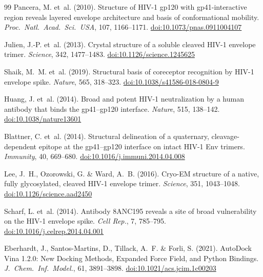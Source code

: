 \documentclass[11pt,a4paper]{article}
\begin{document}
\begin{thebibliography}{99}
Pancera, M. et~al. (2010).
\newblock Structure of HIV-1 gp120 with gp41-interactive region reveals layered envelope architecture and basis of conformational mobility.
\newblock \textit{Proc.\ Natl.\ Acad.\ Sci.\ USA}, 107, 1166--1171.
\newblock \href{https://doi.org/10.1073/pnas.0911004107}{doi:10.1073/pnas.0911004107}

Julien, J.-P. et~al. (2013).
\newblock Crystal structure of a soluble cleaved HIV-1 envelope trimer.
\newblock \textit{Science}, 342, 1477--1483.
\newblock \href{https://doi.org/10.1126/science.1245625}{doi:10.1126/science.1245625}

Shaik, M.~M. et~al. (2019).
\newblock Structural basis of coreceptor recognition by HIV-1 envelope spike.
\newblock \textit{Nature}, 565, 318--323.
\newblock \href{https://doi.org/10.1038/s41586-018-0804-9}{doi:10.1038/s41586-018-0804-9}

Huang, J. et~al. (2014).
\newblock Broad and potent HIV-1 neutralization by a human antibody that binds the gp41--gp120 interface.
\newblock \textit{Nature}, 515, 138--142.
\newblock \href{https://doi.org/10.1038/nature13601}{doi:10.1038/nature13601}

Blattner, C. et~al. (2014).
\newblock Structural delineation of a quaternary, cleavage-dependent epitope at the gp41--gp120 interface on intact HIV-1 Env trimers.
\newblock \textit{Immunity}, 40, 669--680.
\newblock \href{https://doi.org/10.1016/j.immuni.2014.04.008}{doi:10.1016/j.immuni.2014.04.008}

Lee, J.~H., Ozorowski, G. \& Ward, A.~B. (2016).
\newblock Cryo-EM structure of a native, fully glycosylated, cleaved HIV-1 envelope trimer.
\newblock \textit{Science}, 351, 1043--1048.
\newblock \href{https://doi.org/10.1126/science.aad2450}{doi:10.1126/science.aad2450}

Scharf, L. et~al. (2014).
\newblock Antibody 8ANC195 reveals a site of broad vulnerability on the HIV-1 envelope spike.
\newblock \textit{Cell Rep.}, 7, 785--795.
\newblock \href{https://doi.org/10.1016/j.celrep.2014.04.001}{doi:10.1016/j.celrep.2014.04.001}

Eberhardt, J., Santos-Martins, D., Tillack, A.~F. \& Forli, S. (2021).
\newblock AutoDock Vina 1.2.0: New Docking Methods, Expanded Force Field, and Python Bindings.
\newblock \textit{J.\ Chem.\ Inf.\ Model.}, 61, 3891--3898.
\newblock \href{https://doi.org/10.1021/acs.jcim.1c00203}{doi:10.1021/acs.jcim.1c00203}


\end{thebibliography}
\end{document}
